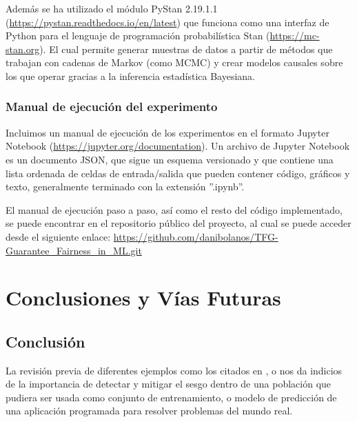 \documentclass[oneside,openright,titlepage,numbers=noenddot,openany,headinclude,footinclude=true,
cleardoublepage=empty,abstractoff,BCOR=5mm,paper=a4,fontsize=12pt,main=spanish]{scrreprt}
\begin{document}
Además se ha utilizado el módulo PyStan 2.19.1.1 (\url{https://pystan.readthedocs.io/en/latest}) que funciona como una interfaz de Python para el lenguaje de programación probabilística Stan (\url{https://mc-stan.org}). El cual permite generar muestras de datos a partir de métodos que trabajan con cadenas de Markov (como MCMC) y crear modelos causales sobre los que operar gracias a la inferencia estadística Bayesiana.

\section{Manual de ejecución del experimento} \label{sec:manual}

Incluimos un manual de ejecución de los experimentos en el formato Jupyter Notebook (\url{https://jupyter.org/documentation}). Un archivo de Jupyter Notebook es un documento JSON, que sigue un esquema versionado y que contiene una lista ordenada de celdas de entrada/salida que pueden contener código, gráficos y texto, generalmente terminado con la extensión ''.ipynb''. 

El manual de ejecución paso a paso, así como el resto del código implementado, se puede encontrar en el repositorio público del proyecto, al cual se puede acceder desde el siguiente enlace:  \url{https://github.com/danibolanos/TFG-Guarantee_Fairness_in_ML.git}



\part{Conclusiones y Vías Futuras} \label{part:debate_fut}

\chapter{Conclusión} \label{ch:conclusion}

La revisión previa de diferentes ejemplos como los citados en \cite{prestamo2018}, \cite{contratar2015} o \cite{condena2016} nos da indicios de la importancia de detectar y mitigar el sesgo dentro de una población que pudiera ser usada como conjunto de entrenamiento, o modelo de predicción de una aplicación programada para resolver problemas del mundo real. 
\end{document}
